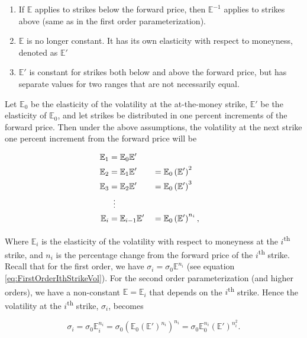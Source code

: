 \documentclass[12pt, a4paper, notitlepage]{article}
\numberwithin{equation}{subsection}
\numberwithin{figure}{subsection}
\numberwithin{table}{subsection}
\newcommand{\newpar}{\newline \newline}
\begin{document}
\begin{enumerate}
\item If $\mathbb{E}$ applies to strikes below the forward price, then $\mathbb{E}^{-1}$ applies to strikes above (same as in the first order parameterization).
\item $\mathbb{E}$ is no longer constant.  It has its own elasticity with respect to moneyness, denoted as $\mathbb{E}'$
\item $\mathbb{E}'$ is constant for strikes both below and above the forward price, but has separate values for two ranges that are not necessarily equal.
\end{enumerate}

Let $\mathbb{E}_0$ be the elasticity of the volatility at the at-the-money strike, $\mathbb{E}'$ be the elasticity of $\mathbb{E}_0$, and let strikes be distributed in one percent increments of the forward price.  Then under the above assumptions, the volatility at the next strike one percent increment from the forward price will be

\begin{alignat*}{3}
	\mathbb{E}_1 &= \mathbb{E}_0\mathbb{E}' \\
    \mathbb{E}_2 &= \mathbb{E}_1\mathbb{E}' &&= \mathbb{E}_0\left(\mathbb{E}'\right)^2 \\
    \mathbb{E}_3 &= \mathbb{E}_2\mathbb{E}' &&= \mathbb{E}_0\left(\mathbb{E}'\right)^3 \\
    &\vdotswithin{=}\\
    \mathbb{E}_i &= \mathbb{E}_{i-1}\mathbb{E}' &&= \mathbb{E}_0\left(\mathbb{E}'\right)^{n_i},
\end{alignat*}

Where $\mathbb{E}_i$ is the elasticity of the volatility with respect to moneyness at the $i$\textsuperscript{th} strike, and $n_i$ is the percentage change from the forward price of the $i$\textsuperscript{th} strike.  
\newpar
Recall that for the first order, we have $\sigma_i = \sigma_0\mathbb{E}^{n_i}$ (see equation \ref{eq:FirstOrderIthStrikeVol}).  For the second order parameterization (and higher orders), we have a non-constant $\mathbb{E} = \mathbb{E}_i$ that depends on the $i$\textsuperscript{th} strike.  Hence the volatility at the $i$\textsuperscript{th}  strike, $\sigma_i$, becomes

\begin{equation*}
	\sigma_i = \sigma_0\mathbb{E}_i^{n_i} = \sigma_0\left(\mathbb{E}_0\left(\mathbb{E}'\right)^{n_i}\right)^{n_i} = \sigma_0\mathbb{E}_0^{n_i}\left(\mathbb{E'}\right)^{n_i^{2}}.
\end{equation*}
\end{document}
